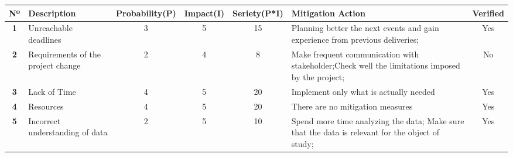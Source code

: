 \begin{longtable}{|c|p{2cm}|c|c|c|p{2cm}|c|} 
    
    \hline
     \textbf{Nº} & 
     \textbf{Description} & 
     \textbf{Probability(P)} & 
     \textbf{Impact(I)} & 
     \textbf{Seriety(P*I)} & 
     \textbf{Mitigation Action} & 
     \textbf{Verified}  
     \\ \hline
    \endfirsthead

    \hline
    \textbf{1} 
    & 
    Unreachable deadlines
    & 3 
    & 5 
    & 15 
    & Planning better the next events and gain experience from previous deliveries;
    & Yes 
    \\ \hline
    
    \textbf{2} 
    & 
    Requirements of the project change
    & 2 
    & 4 
    & 8 
    & Make frequent communication with stakeholder;Check well the limitations imposed by the project;
    & No
    \\ \hline
	
    \textbf{3} 
    & 
    Lack of Time
    & 4 
    & 5 
    & 20 
    & Implement only what is actually needed
    & Yes
    \\ \hline

     \textbf{4} 
    & 
    Resources
    & 4 
    & 5 
    & 20 
    & There are no mitigation measures
    & Yes
    \\ \hline

     \textbf{5} 
    & 
    Incorrect understanding of data
    & 2 
    & 5 
    & 10 
    & Spend more time analyzing the data; Make sure that the data is relevant for the object of study;
    & Yes
    \\ \hline
    \end{longtable}
    
    
    
